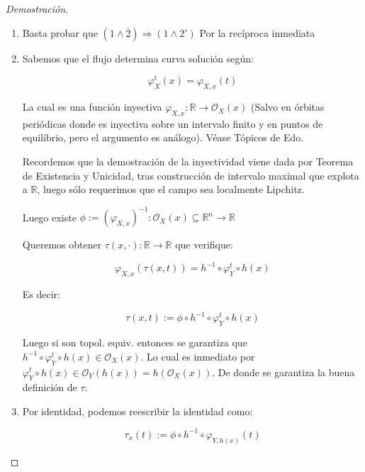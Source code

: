 \begin{proof}[Demostración]
	
	\begin{enumerate}
		\item Basta probar que $(1 \land \overline{2}) \Rightarrow (1\land 2')$ Por la recíproca inmediata
		
		\item Sabemos que el flujo determina curva solución según:
		
		\begin{equation*}
			\varphi_X^t(x)  = \varphi_{X,x}(t)
		\end{equation*}
		
		La cual es una función inyectiva $\varphi_{X,x}: \mathbb{R} \to \mathcal{O}_X(x)$  (Salvo en órbitas periódicas donde es inyectiva sobre un intervalo finito y en puntos de equilibrio, pero el argumento es análogo). Véase Tópicos de Edo.
		
		Recordemos que la demostración de la inyectividad viene dada por Teorema de Existencia y Unicidad, tras construcción de intervalo maximal que explota a $\mathbb{R}$, luego sólo requerimos que el campo sea localmente Lipchitz.
		
		Luego existe $\phi := (\varphi_{X,x})^{-1} : \mathcal{O}_X(x)\subseteq  \mathbb{R}^n \to \mathbb{R}$
		
		Queremos obtener $\tau(x,\cdot):\mathbb{R} \to \mathbb{R}$ que verifique:
		
		\begin{equation*}
			\varphi_{X,x}(\tau(x,t)) = h^{-1}\circ \varphi_Y^t\circ h(x)	
		\end{equation*}
		
		Es decir:
		
		\begin{equation*}
			\tau(x,t) := \phi \circ h^{-1}\circ \varphi_Y^t \circ h(x)	
		\end{equation*}
		
		Luego si son topol. equiv. entonces se garantiza que $h^{-1}\circ \varphi_Y^t\circ h(x) \in \mathcal{O}_X(x)$. Lo cual es inmediato por $\varphi_Y^t\circ h(x) \in \mathcal{O}_Y(h(x)) = h(\mathcal{O}_X(x))$. De donde se garantiza la buena definición de $\tau$.
		
		\item Por identidad, podemos reescribir la identidad como:
		
		
		\begin{equation*}
			\tau_x(t) := \phi \circ h^{-1}\circ \varphi_{Y,h(x) } (t)	
		\end{equation*}
		

\end{enumerate}
\end{proof}
